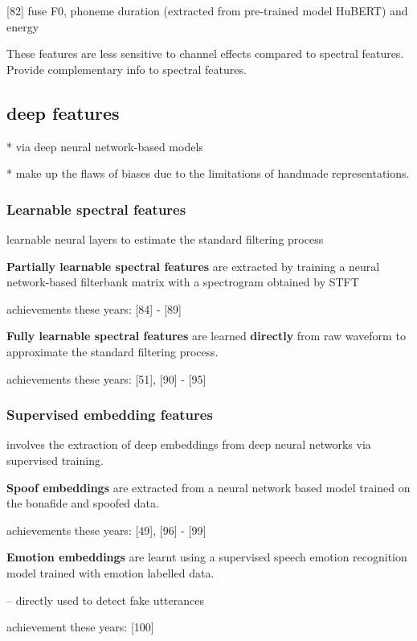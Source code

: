 \documentclass{article}
\begin{document}
[82] fuse F0, phoneme duration (extracted from pre-trained model HuBERT) and energy

\vspace{10pt}
These features are less sensitive to channel effects compared to spectral features. Provide complementary info to spectral features. 


\subsection{deep features}
* via deep neural network-based models

* make up the flaws of biases due to the limitations of handmade representations. 

\subsubsection{Learnable spectral features}
learnable neural layers to estimate the standard filtering process

\vspace{5pt}
\textbf{Partially learnable spectral features} are extracted by training a neural network-based filterbank matrix with a spectrogram obtained by STFT

achievements these years: [84] - [89]

\textbf{Fully learnable spectral features} are learned \textbf{directly} from raw waveform to approximate the standard filtering process. 

achievements these years: [51], [90] - [95]

\subsubsection{Supervised embedding features}
involves the extraction of deep embeddings from deep neural networks via supervised training. 

\vspace{5pt}
\textbf{Spoof embeddings} are extracted from a neural network based model trained on the bonafide and spoofed data. 

achievements these years: [49], [96] - [99]

\vspace{5pt}
\textbf{Emotion embeddings} are learnt using a supervised speech emotion recognition model trained with emotion labelled data. 

-- directly used to detect fake utterances

achievement these years: [100]
\end{document}
